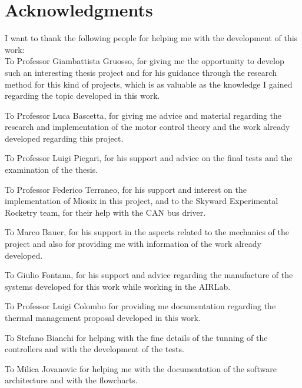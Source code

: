 
\bigskip

\begingroup
\let\clearpage\relax
\let\cleardoublepage\relax
\let\cleardoublepage\relax
\chapter*{Acknowledgments}

I want to thank the following people for helping me with the development of this work:\\

To Professor Giambattista Gruosso, for giving me the opportunity to develop such an interesting thesis project and for his guidance through the research method for this kind of projects, which is as valuable as the knowledge I gained regarding the topic developed in this work.

To Professor Luca Bascetta, for giving me advice and material regarding the research and implementation of the motor control theory and the work already developed regarding this project.

To Professor Luigi Piegari, for his support and advice on the final tests and the examination of the thesis.

To Professor Federico Terraneo, for his support and interest on the implementation of Miosix in this project, and to the Skyward Experimental Rocketry team, for their help with the CAN bus driver.

To Marco Bauer, for his support in the aspects related to the mechanics of the project and also for providing me with information of the work already developed.

To Giulio Fontana, for his support and advice regarding the manufacture of the systems developed for this work while working in the AIRLab.

To Professor Luigi Colombo for providing me documentation regarding the thermal management proposal developed in this work.

To Stefano Bianchi for helping with the fine details of the tunning of the controllers and with the development of the tests.

To Milica Jovanovic for helping me with the documentation of the software architecture and with the flowcharts.\\


\endgroup